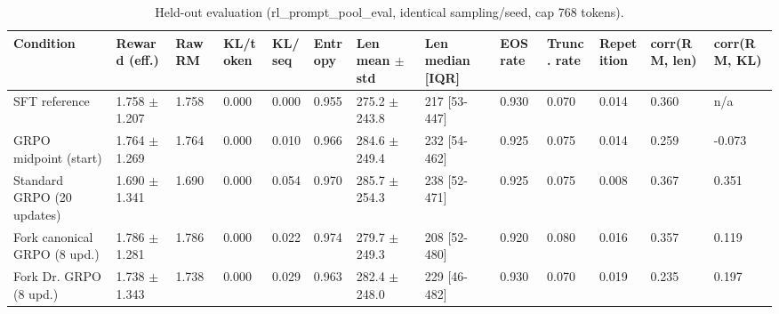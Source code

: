 \begin{table}[t]
\centering
\small
\caption{Held-out evaluation (rl\_prompt\_pool\_eval, identical sampling/seed, cap 768 tokens).}
\begin{tabular}{lllllllllllll}
\toprule
Condition & Reward (eff.) & Raw RM & KL/token & KL/seq & Entropy & Len mean $\pm$ std & Len median [IQR] & EOS rate & Trunc. rate & Repetition & corr(RM, len) & corr(RM, KL) \\
\midrule
SFT reference & 1.758 $\pm$ 1.207 & 1.758 & 0.000 & 0.000 & 0.955 & 275.2 $\pm$ 243.8 & 217 [53-447] & 0.930 & 0.070 & 0.014 & 0.360 & n/a \\
GRPO midpoint (start) & 1.764 $\pm$ 1.269 & 1.764 & 0.000 & 0.010 & 0.966 & 284.6 $\pm$ 249.4 & 232 [54-462] & 0.925 & 0.075 & 0.014 & 0.259 & -0.073 \\
Standard GRPO (20 updates) & 1.690 $\pm$ 1.341 & 1.690 & 0.000 & 0.054 & 0.970 & 285.7 $\pm$ 254.3 & 238 [52-471] & 0.925 & 0.075 & 0.008 & 0.367 & 0.351 \\
Fork canonical GRPO (8 upd.) & 1.786 $\pm$ 1.281 & 1.786 & 0.000 & 0.022 & 0.974 & 279.7 $\pm$ 249.3 & 208 [52-480] & 0.920 & 0.080 & 0.016 & 0.357 & 0.119 \\
Fork Dr. GRPO (8 upd.) & 1.738 $\pm$ 1.343 & 1.738 & 0.000 & 0.029 & 0.963 & 282.4 $\pm$ 248.0 & 229 [46-482] & 0.930 & 0.070 & 0.019 & 0.235 & 0.197 \\
\bottomrule
\end{tabular}
\end{table}
